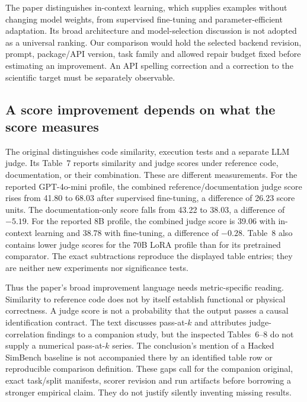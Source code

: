 The paper distinguishes in-context learning, which supplies examples without
changing model weights, from supervised fine-tuning and parameter-efficient
adaptation. Its broad architecture and model-selection discussion is not
adopted as a universal ranking. Our comparison would hold the selected
backend revision, prompt, package/API version, task family and allowed repair
budget fixed before estimating an improvement. An API spelling correction
and a correction to the scientific target must be separately observable.
\citep{exec24_chronollm_original}

\subsection{A score improvement depends on what the score measures}
The original distinguishes code similarity, execution tests and a separate
LLM judge. Its Table~7 reports similarity and judge scores under reference
code, documentation, or their combination. These are different measurements.
For the reported GPT-4o-mini profile, the combined reference/documentation
judge score rises from 41.80 to 68.03 after supervised fine-tuning, a difference
of 26.23 score units. The documentation-only score falls from 43.22 to 38.03,
a difference of $-5.19$. For the reported 8B profile, the combined judge score
is 39.06 with in-context learning and 38.78 with fine-tuning, a difference
of $-0.28$. Table~8 also contains lower judge scores for the 70B LoRA profile
than for its pretrained comparator. The exact subtractions reproduce the
displayed table entries; they are neither new experiments nor significance
tests.\citep{exec24_chronollm_original,exec24_chronollm_reference}

Thus the paper's broad improvement language needs metric-specific reading.
Similarity to reference code does not by itself establish functional or
physical correctness. A judge score is not a probability that the output
passes a causal identification contract. The text discusses pass-at-$k$ and
attributes judge-correlation findings to a companion study, but the inspected
Tables~6--8 do not supply a numerical pass-at-$k$ series. The conclusion's
mention of a Hacked SimBench baseline is not accompanied there by an
identified table row or reproducible comparison definition. These gaps call
for the companion original, exact task/split manifests, scorer revision and
run artifacts before borrowing a stronger empirical claim. They do not
justify silently inventing missing results.\citep{exec24_chronollm_original}

